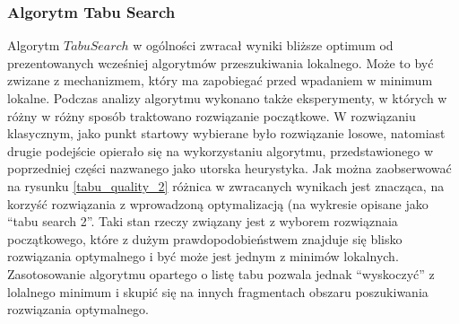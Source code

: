 \subsubsection {Algorytm Tabu Search}

Algorytm $Tabu Search$ w ogólności zwracał wyniki bliższe optimum od
prezentowanych wcześniej algorytmów przeszukiwania lokalnego. Może to być
zwizane z mechanizmem, który ma zapobiegać przed wpadaniem w minimum
lokalne. Podczas analizy algorytmu wykonano także eksperymenty, w których
w różny w różny sposób traktowano rozwiązanie początkowe. W rozwiązaniu
klasycznym, jako punkt startowy wybierane było rozwiązanie losowe,
natomiast drugie podejście opierało się na wykorzystaniu algorytmu,
przedstawionego w poprzedniej części nazwanego jako utorska heurystyka.
Jak można zaobserwować na rysunku \ref{tabu_quality_2} różnica w
zwracanych wynikach jest znacząca, na korzyść rozwiązania z wprowadzoną
optymalizacją (na wykresie opisane jako ``tabu search 2''.
Taki stan rzeczy związany jest z wyborem rozwiąznaia początkowego,
które z dużym prawdopodobieństwem znajduje się blisko rozwiązania
optymalnego i być może jest jednym z minimów lokalnych. Zasotosowanie
algorytmu opartego o listę tabu pozwala jednak ``wyskoczyć'' z lolalnego
minimum i skupić się na innych fragmentach obszaru poszukiwania
rozwiązania optymalnego.

